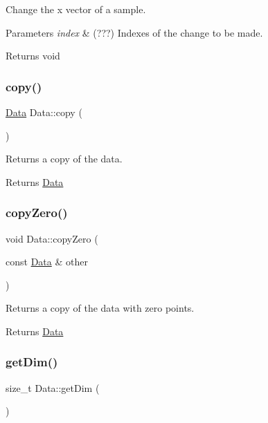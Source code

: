 Change the x vector of a sample. 


\begin{DoxyParams}{Parameters}
{\em index} & (???) Indexes of the change to be made. \\
\hline
\end{DoxyParams}
\begin{DoxyReturn}{Returns}
void 
\end{DoxyReturn}
\mbox{\label{class_data_afb7687021aa7d5f1ecae464eee601710}} 
\subsubsection{\texorpdfstring{copy()}{copy()}}
{\footnotesize\ttfamily \hyperlink{class_data}{Data} Data\+::copy (\begin{DoxyParamCaption}{ }\end{DoxyParamCaption})}



Returns a copy of the data. 

\begin{DoxyReturn}{Returns}
\hyperlink{class_data}{Data} 
\end{DoxyReturn}
\mbox{\label{class_data_a6454e835f570d10e7614ac237d6fdf79}} 
\subsubsection{\texorpdfstring{copy\+Zero()}{copyZero()}}
{\footnotesize\ttfamily void Data\+::copy\+Zero (\begin{DoxyParamCaption}\item[{const \hyperlink{class_data}{Data} \&}]{other }\end{DoxyParamCaption})}



Returns a copy of the data with zero points. 

\begin{DoxyReturn}{Returns}
\hyperlink{class_data}{Data} 
\end{DoxyReturn}
\mbox{\label{class_data_a7aba855040506ff3c7ce6ffb2b2773b4}} 
\subsubsection{\texorpdfstring{get\+Dim()}{getDim()}}
{\footnotesize\ttfamily size\+\_\+t Data\+::get\+Dim (\begin{DoxyParamCaption}{ }\end{DoxyParamCaption})\hspace{0.3cm}{\ttfamily [inline]}}



